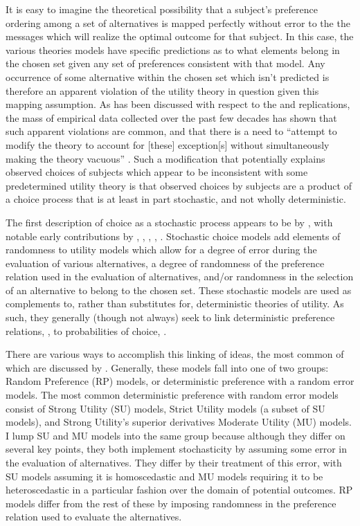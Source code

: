 \documentclass[../main.tex]{subfiles}
\begin{document}
It is easy to imagine the theoretical possibility that a subject's preference ordering among a set of alternatives is mapped perfectly without error to the the messages which will realize the optimal outcome for that subject.
In this case, the various theories models have specific predictions as to what elements belong in the chosen set given any set of preferences consistent with that model.
Any occurrence of some alternative within the chosen set which isn't predicted is therefore an apparent violation of the utility theory in question given this mapping assumption.
As has been discussed with respect to the \textcite{Grether1979} and \textcite{Holt2002} replications, the mass of empirical data collected over the past few decades has shown that such apparent violations are common, and that there is a need to \enquote{attempt to modify the theory to account for [these] exception[s] without simultaneously making the theory vacuous} \textcite[634]{Grether1979}.
Such a modification that potentially explains observed choices of subjects which appear to be inconsistent with some predetermined utility theory is that observed choices by subjects are a product of a choice process that is at least in part stochastic, and not wholly deterministic.


The first description of choice as a stochastic process appears to be by \textcite{Edwards1954}, with notable early contributions by \textcite{Luce1958}, \textcite{Debreu1958}, \textcite{Davidson1959}, \textcite{Becker1963}, \textcite{Luce1965}.
Stochastic choice models add elements of randomness to utility models which allow for a degree of error during the evaluation of various alternatives, a degree of randomness of the preference relation used  in the evaluation of alternatives, and/or randomness in the selection of an alternative to belong to the chosen set.
These stochastic models are used as complements to, rather than substitutes for, deterministic theories of utility.
As such, they generally (though not always) seek to link deterministic preference relations, , to probabilities of choice, .

There are various ways to accomplish this linking of ideas, the most common of which are discussed by \textcite{Wilcox2008}.
Generally, these models fall into one of two groups: Random Preference (RP) models, or deterministic preference with a random error models.
The most common deterministic preference with random error models consist of Strong Utility (SU) models, Strict Utility models (a subset of SU models), and Strong Utility's superior derivatives Moderate Utility (MU) models.
I lump SU and MU models into the same group because although they differ on several key points, they both implement stochasticity by assuming some error in the evaluation of alternatives.
They differ by their treatment of this error, with SU models assuming it is homoscedastic and MU models requiring it to be heteroscedastic in a particular fashion over the domain of potential outcomes.
RP models differ from the rest of these by imposing randomness in the preference relation used to evaluate the alternatives.
\end{document}
